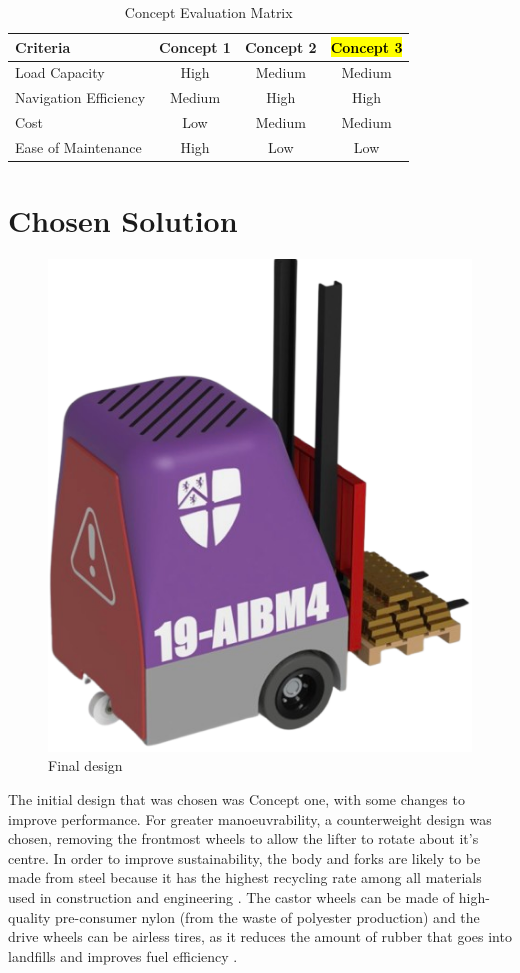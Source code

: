 \documentclass[12pt]{article}
\begin{document}
\begin{table}[h!]
\centering
\caption{Concept Evaluation Matrix}
\begin{tabular}{@{}lccc@{}}
\toprule
\textbf{Criteria}      & \textbf{Concept 1} & \textbf{Concept 2} &\hl{\textbf{Concept 3}} \\ \midrule
Load Capacity          & High               & Medium              & Medium            \\
Navigation Efficiency  & Medium             & High                & High              \\
Cost                   & Low                & Medium              & Medium            \\
Ease of Maintenance    & High               & Low                 & Low               \\ \bottomrule
\end{tabular}
\label{tab:concept_evaluation}
\end{table}
\FloatBarrier

\section{Chosen Solution}
\begin{figure}[H]
    \centering
    \includegraphics[width=0.4\linewidth]{finaldesign1rb.png}  %
    \caption{Final design}
    \label{fig:x}
\end{figure}



The initial design that was chosen was Concept one, with some changes to improve performance. For greater manoeuvrability, a counterweight design was chosen, removing the frontmost wheels to allow the lifter to rotate about it's centre.
In order to improve sustainability, the body and forks are likely to be made from steel because it has the highest recycling rate among all materials used in construction and engineering \cite{baker2023}. The castor wheels can be made of high-quality pre-consumer nylon (from the waste of polyester production) \cite{eco2022} and the drive wheels can be airless tires, as it reduces the amount of rubber that goes into landfills and improves fuel efficiency \cite{ImperialTyres}.
\end{document}

